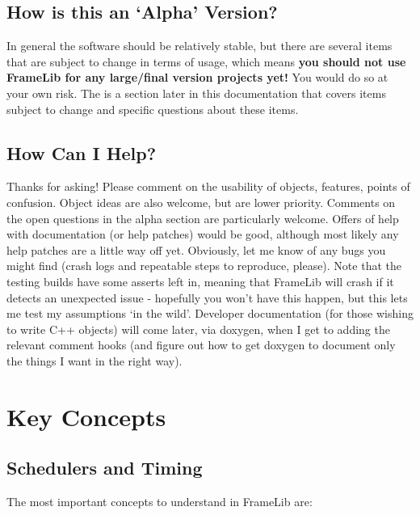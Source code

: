 \documentclass{article}
\begin{document}
\subsection{How is this an `Alpha' Version?}

In general the software should be relatively stable, but there are several items that are subject to change in terms of usage, which means \textbf{you should not use FrameLib for any large/final version projects yet!} You would do so at your own risk. The is a section later in this documentation that covers items subject to change and specific questions about these items.

\subsection{How Can I Help?}

Thanks for asking! Please comment on the usability of objects, features, points of confusion. Object ideas are also welcome, but are lower priority. Comments on the open questions in the alpha section are particularly welcome. Offers of help with documentation (or help patches) would be good, although most likely any help patches are a little way off yet. Obviously, let me know of any bugs you might find (crash logs and repeatable steps to reproduce, please). Note that the testing builds have some asserts left in, meaning that FrameLib will crash if it detects an unexpected issue - hopefully you won't have this happen, but this lets me test my assumptions `in the wild'. Developer documentation (for those wishing to write C++ objects) will come later, via doxygen, when I get to adding the relevant comment hooks (and figure out how to get doxygen to document only the things I want in the right way).
\pagebreak


\section{Key Concepts}
\vspace{0.1in}

\subsection{Schedulers and Timing}

The most important concepts to understand in FrameLib are:
\end{document}

